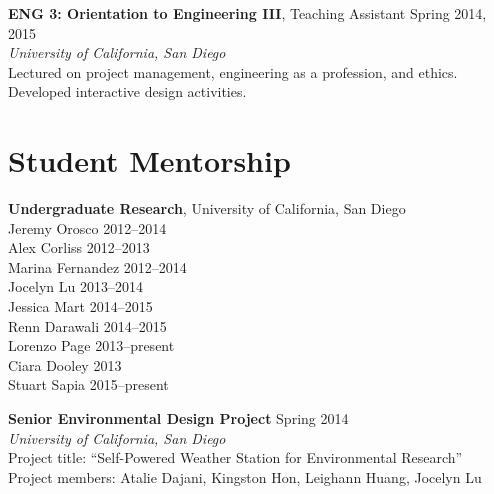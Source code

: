 \documentclass[]{res}
\begin{document}
\begin{resume}
\textbf{ENG 3: Orientation to Engineering III}, Teaching Assistant \hfill Spring 2014, 2015 \\
\textit{University of California, San Diego} \\
Lectured on project management, engineering as a profession, and ethics. \\
Developed interactive design activities.


%


\section{Student Mentorship}
\vspace{0.1in}

\textbf{Undergraduate Research}, University of California, San Diego \\
Jeremy Orosco \hfill 2012--2014 \\
Alex Corliss \hfill 2012--2013 \\
Marina Fernandez \hfill 2012--2014 \\
Jocelyn Lu \hfill 2013--2014 \\
Jessica Mart \hfill 2014--2015 \\
Renn Darawali \hfill 2014--2015 \\
Lorenzo Page \hfill 2013--present \\
Ciara Dooley \hfill 2013 \\
Stuart Sapia \hfill 2015--present

\textbf{Senior Environmental Design Project} \hfill Spring 2014 \\
\textit{University of California, San Diego} \\
Project title: ``Self-Powered Weather Station for Environmental Research'' \\
Project members: Atalie Dajani, Kingston Hon, Leighann Huang, Jocelyn Lu


\end{resume}
\end{document}
